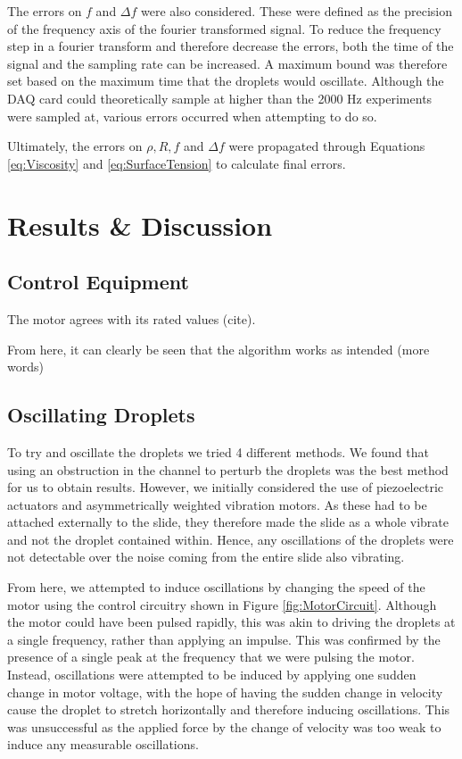 \documentclass{physics_article_B}
\begin{document}
    The errors on $f$ and $\Delta f$ were also considered. These were defined as the precision of the frequency axis of the fourier transformed signal. To reduce the frequency step in a fourier transform and therefore decrease the errors, both the time of the signal and the sampling rate can be increased. A maximum bound was therefore set based on the maximum time that the droplets would oscillate. Although the DAQ card could theoretically sample at higher than the 2000 Hz experiments were sampled at, various errors occurred when attempting to do so.
    
    Ultimately, the errors on $\rho, R, f$ and $\Delta f$ were propagated through Equations \ref{eq:Viscosity} and \ref{eq:SurfaceTension} to calculate final errors.
    
\section{Results \& Discussion}
    
    \subsection{Control Equipment}
    
        The motor agrees with its rated values (cite).
    
		
        
     	From here, it can clearly be seen that the algorithm works as intended (more words)

    \subsection{Oscillating Droplets}
      
        To try and oscillate the droplets we tried 4 different methods. We found that using an obstruction in the channel to perturb the droplets was the best method for us to obtain results. However, we initially considered the use of piezoelectric actuators and asymmetrically weighted vibration motors. As these had to be attached externally to the slide, they therefore made the slide as a whole vibrate and not the droplet contained within. Hence, any oscillations of the droplets were not detectable over the noise coming from the entire slide also vibrating.
        
        From here, we attempted to induce oscillations by changing the speed of the motor using the control circuitry shown in Figure \ref{fig:MotorCircuit}. Although the motor could have been pulsed rapidly, this was akin to driving the droplets at a single frequency, rather than applying an impulse. This was confirmed by the presence of a single peak at the frequency that we were pulsing the motor. Instead, oscillations were attempted to be induced by applying one sudden change in motor voltage, with the hope of having the sudden change in velocity cause the droplet to stretch horizontally and therefore inducing oscillations. This was unsuccessful as the applied force by the change of velocity was too weak to induce any measurable oscillations. 
        
\end{document}
